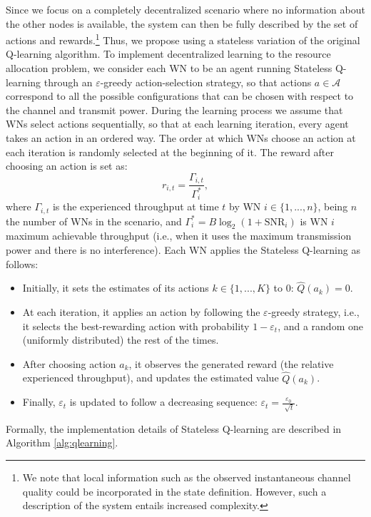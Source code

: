\documentclass[conference]{IEEEtran}
\begin{document}
	Since we focus on a completely decentralized scenario where no information about the other nodes is available, the system can then be fully described by the set of actions and rewards.\footnote{We note that local information such as the observed instantaneous channel quality could be incorporated in the state definition. However, such a description of the system entails increased complexity.} Thus, we propose using a stateless variation of the original Q-learning algorithm. To implement decentralized learning to the resource allocation problem, we consider each WN to be an agent running Stateless Q-learning through an $\varepsilon$-greedy action-selection strategy, so that actions $a \in \mathcal{A}$ correspond to all the possible configurations that can be chosen with respect to the channel and transmit power. During the learning process we assume that WNs select actions sequentially, so that at each learning iteration, every agent takes an action in an ordered way. The order at which WNs choose an action at each iteration is randomly selected at the beginning of it. The reward after choosing an action is set as:
	\begin{equation}
	r_{i,t} = \frac{\Gamma_{i,t}}{\Gamma_i^*},
	\label{eq:reward_generation}
	\nonumber
	\end{equation}
	where $\Gamma_{i,t}$ is the experienced throughput at time $t$ by WN $i \in \{1,...,n\}$, being $n$ the number of WNs in the scenario, and $\Gamma_{i}^* = B \log_{2}(1 + \text{SNR}_{i})$ is WN $i$ maximum achievable throughput (i.e., when it uses the maximum transmission power and there is no interference).	Each WN applies the Stateless Q-learning as follows: 
	\begin{itemize}
		\item Initially, it sets the estimates of its actions $k \in \{1,...,K\}$ to 0: $\hat{Q}(a_k) = 0$.
		\item At each iteration, it applies an action by following the $\varepsilon$-greedy strategy, i.e., it selects the best-rewarding action with probability $1 - \varepsilon_t$, and a random one (uniformly distributed) the rest of the times.
		\item After choosing action $a_k$, it observes the generated reward (the relative experienced throughput), and updates the estimated value $\hat{Q}(a_k)$.
		\item Finally, $\varepsilon_t$ is updated to follow a decreasing sequence: $\varepsilon_t = \frac{\varepsilon_0}{\sqrt[]{t}}$.
	\end{itemize}	
	Formally, the implementation details of Stateless Q-learning are described in Algorithm \ref{alg:qlearning}.
\end{document}
